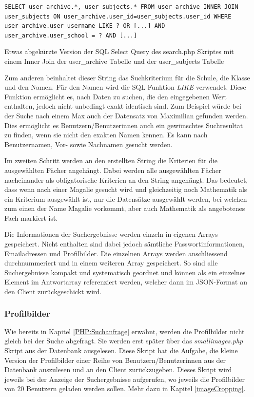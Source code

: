 \documentclass[../main.tex]{subfiles}
\begin{document}
	 \begin{code}
	 	\begin{center}
	 		\begin{verbatim}
SELECT user_archive.*, user_subjects.* FROM user_archive INNER JOIN user_subjects ON user_archive.user_id=user_subjects.user_id WHERE user_archive.user_username LIKE ? OR [...] AND user_archive.user_school = ? AND [...]
	 		\end{verbatim}
	 		\caption{Etwas abgekürzte Version der SQL Select Query des search.php Skriptes mit einem Inner Join der user\_archive Tabelle und der user\_subjects Tabelle}\label{SQL:INNERJOIN}
		\end{center}
	\end{code}	
	 
	 Zum anderen beinhaltet dieser String das  Suchkriterium für die Schule, die Klasse und den Namen. Für den Namen wird die SQL Funktion \emph{LIKE} verwendet. Diese Funktion ermöglicht es, nach Daten zu suchen, die den eingegebenen Wert enthalten, jedoch nicht unbedingt exakt identisch sind. Zum Beispiel würde bei der Suche nach einem \glqq Max\grqq{} auch der Datensatz von \glqq Maximilian\grqq{} gefunden werden. Dies ermöglicht es Benutzern/Benutzerinnen auch ein gewünschtes Suchresultat zu finden, wenn sie nicht den exakten Namen kennen. Es kann nach Benutzernamen, Vor- sowie Nachnamen gesucht werden.
	 
	 Im zweiten Schritt werden an den erstellten String die Kriterien für die ausgewählten Fächer angehängt. Dabei werden alle ausgewählten Fächer nacheinander als obligatorische Kriterien an den String angehängt. Das bedeutet, dass wenn nach einer \glqq Magalie\grqq{} gesucht wird und gleichzeitig noch Mathematik als ein Kriterium ausgewählt ist, nur die Datensätze ausgewählt werden, bei welchen zum einen der Name \glqq Magalie\grqq{} vorkommt, aber auch Mathematik als angebotenes Fach markiert ist.
	 
	 Die Informationen der Suchergebnisse werden einzeln in eigenen Arrays gespeichert. Nicht enthalten sind dabei jedoch sämtliche Passwortinformationen, Emailadressen und Profilbilder. Die einzelnen Arrays werden anschliessend durchnummeriert und in einem weiteren Array gespeichert. So sind alle Suchergebnisse kompakt und systematisch geordnet und können als ein einzelnes Element im Antwortarray referenziert werden, welcher dann im JSON-Format an den Client zurückgeschickt wird.
	 
	 \subsubsection{Profilbilder}
	 Wie bereits in Kapitel \ref{PHP:Suchanfrage} erwähnt, werden die Profilbilder nicht gleich bei der Suche abgefragt. Sie werden erst später über das \emph{smallimages.php} Skript aus der Datenbank ausgelesen. Diese Skript hat die Aufgabe, die kleine Version der Profilbilder einer Reihe von Benutzern/Benutzerinnen aus der Datenbank auszulesen und an den Client zurückzugeben. Dieses Skript wird jeweils bei der Anzeige der Suchergebnisse aufgerufen, wo jeweils die Profilbilder von 20 Benutzern geladen werden sollen. Mehr dazu in Kapitel \ref{imageCropping}.
	 
\end{document}
